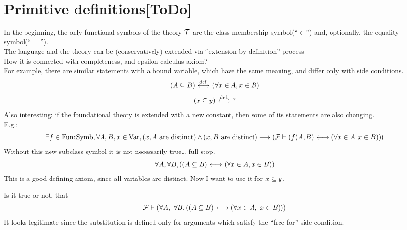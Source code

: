 \iffalse %
\
\section{Primitive definitions[ToDo]}

In the beginning, the only functional symbols of the theory $\mathcal{T}$ are the class membership symbol(``$\in$'') and, optionally, the equality symbol(``$=$'').\\
The language and the theory can be (conservatively) extended via ``extension by definition'' process.\\
How it is connected with completeness, and epsilon calculus axiom?\\
For example, there are similar statements with a bound variable, which have the same meaning, and differ only with side conditions.
\[
(A\subseteq B)
\ {\stackrel{{\textrm{def.}}}{\longleftrightarrow}}\ 
(\forall x\in A, x\in B)
\]
\[
(x\subseteq y)
\ {\stackrel{{\textrm{def.}}}{\longleftrightarrow}}\ 
?
\]
Also interesting: if the foundational theory is extended with a new constant, then some of its statements are also changing.\\
E.g.:
\[
\exists f\in\text{FuncSymb},
\forall A,B,x\in \mathrm{Var}, 
(x,A\text{ are distinct})
\land
(x,B\text{ are distinct})
\longrightarrow 
({\mathcal{F}}\vdash (f(A,B) {\ \longleftrightarrow\ } (\forall x\in A, x\in B)))
\]
Without this new subclass symbol it is not necessarily true\dots
full stop.
\[
\forall A, \forall B, 
(
(A\subseteq B)
{\ \longleftrightarrow\ }
(\forall x\in A, x\in B)
)
\]
This is a good defining axiom, since all variables are distinct.
Now I want to use it for $x\subseteq y$.

Is it true or not, that
\[
{\mathcal{F}} \vdash
(
\forall A,\ \forall B, 
(
(A\subseteq B)
{\ \longleftrightarrow\ }
(\forall x\in A,\ x\in B)
)
)
\]
It looks legitimate since the substitution is defined only for arguments which satisfy the ``free for'' side condition.
\pagebreak

